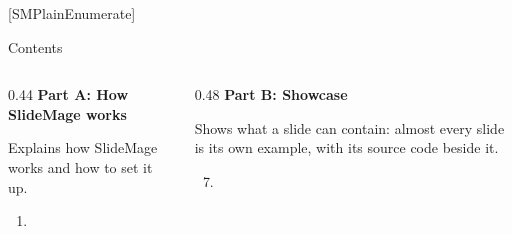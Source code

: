 
[SMPlainEnumerate]
\begin{standardframe}{Contents}
	\small
	\SMDeckAgenda
	\par\medskip
	\begin{columns}[t,onlytextwidth]
		\begin{column}{0.44\linewidth}
			\textcolor{c_primary_highlight}{\textbf{Part A: How SlideMage works}}\par\smallskip
			\parbox[t][3\baselineskip][t]{\linewidth}{Explains how SlideMage works and how to set it up.\strut}\par\smallskip\prevdepth=0pt
			\begin{enumerate}
				\tableofcontents[sections={1-6},hideallsubsections]
				\ifnum\value{enumi}=0 \item[] \fi
			\end{enumerate}
		\end{column}
		\begin{column}{0.48\linewidth}
			\textcolor{c_primary_highlight}{\textbf{Part B: Showcase}}\par\smallskip
			\parbox[t][3\baselineskip][t]{\linewidth}{Shows what a slide can contain: almost every slide is its own example, with its source code beside it.\strut}\par\smallskip\prevdepth=0pt
			\begin{enumerate}
				\setcounter{enumi}{6}
				\tableofcontents[sections={7-12},hideallsubsections]
				\ifnum\value{enumi}=6 \item[] \fi
			\end{enumerate}
		\end{column}
	\end{columns}
\end{standardframe}
